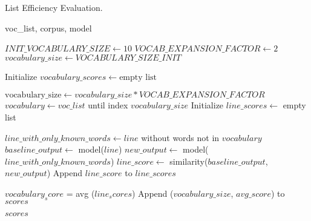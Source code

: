 \begin{algorithm}
\caption{List Efficiency Evaluation.}
\label{alg:efficiency-evaluation}
\begin{algorithmic}[1]
\Require voc\_list, corpus, model

\State $INIT\_VOCABULARY\_SIZE \gets 10$ 
\State $VOCAB\_EXPANSION\_FACTOR \gets 2$ 
\State $vocabulary\_size \gets VOCABULARY\_SIZE\_INIT$ 

\State Initialize $vocabulary\_scores \gets \text{empty list}$

    \State $\text{vocabulary\_size} \gets vocabulary\_size * VOCAB\_EXPANSION\_FACTOR$ 
    \State $vocabulary \gets voc\_list$ until index $vocabulary\_size$
    \State Initialize $line\_scores \gets$ empty list
    
        \State $line\_with\_only\_known\_words \gets line $ without words not in $vocabulary$
        \State $baseline\_output \gets$ model($line$)
        \State $new\_output \gets$ model($line\_with\_only\_known\_words$)
        \State $line\_score \gets$ similarity($baseline\_output $, $new\_output$)
        \State Append $line\_score$ to $line\_scores$
    \EndFor

    \State $vocabulary_score$ = avg ($line_scores$)
    \State Append ($vocabulary\_size$, $avg\_score$) to $scores$
\EndWhile

\State \Return $scores$

\end{algorithmic}
\end{algorithm}
